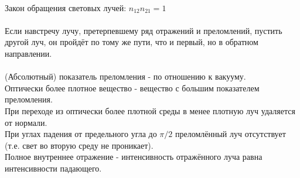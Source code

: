 \documentclass[14pt]{extarticle}
\begin{document}
\\
Закон обращения световых лучей: $n_{12} n_{21} = 1$ \\\\
Если навстречу лучу, претерпевшему ряд отражений и преломлений, пустить
другой луч, он пройдёт по тому же пути, что и первый, но в обратном 
направлении. \\\\
(Абсолютный) показатель преломления - по отношению к вакууму. \\
Оптически более плотное вещество - вещество с большим показателем преломления.
\\
При переходе из оптически более плотной среды в менее плотную луч удаляется
от нормали.\\
При углах падения от предельного угла до $\pi/2$ преломлённый луч отсутствует
(т.е. свет во вторую среду не проникает). 
\\
Полное внутреннее отражение - интенсивность отражённого луча равна 
интенсивности падающего.
\end{document}
